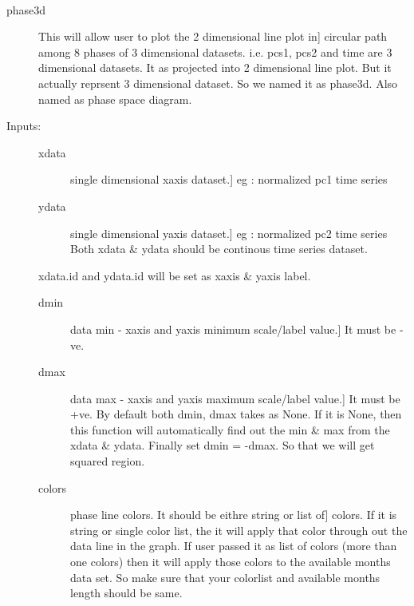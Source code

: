 \documentclass[letterpaper,10pt,english]{sphinxmanual}
\begin{document}
\begin{fulllineitems}
\label{mjo:phase3d.phase3d}~\begin{description}
\item[{phase3d}] \leavevmode{[}This will allow user to plot the 2 dimensional line plot in{]}
circular path among 8 phases of 3 dimensional datasets.
i.e. pcs1, pcs2 and time are 3 dimensional datasets. It as
projected into 2 dimensional line plot. But it actually reprsent
3 dimensional dataset. So we named it as phase3d.
Also named as phase space diagram.

\item[{Inputs:}] \leavevmode\begin{description}
\item[{xdata}] \leavevmode{[}single dimensional xaxis dataset.{]}
eg : normalized pc1 time series

\item[{ydata}] \leavevmode{[}single dimensional yaxis dataset.{]}
eg : normalized pc2 time series
Both xdata \& ydata should be continous time series dataset.

\end{description}

xdata.id and ydata.id will be set as xaxis \& yaxis label.
\begin{description}
\item[{dmin}] \leavevmode{[}data min - xaxis and yaxis minimum scale/label value.{]}
It must be -ve.

\item[{dmax}] \leavevmode{[}data max - xaxis and yaxis maximum scale/label value.{]}
It must be +ve.
By default both dmin, dmax takes as None. If it is None, then
this function will automatically find out the min \& max from
the xdata \& ydata. Finally set dmin = -dmax. So that we will
get squared region.

\item[{colors}] \leavevmode{[}phase line colors. It should be eithre string or list of{]}
colors. If it is string or single color list, the it will
apply that color through out the data line in the graph.
If user passed it as list of colors (more than one colors)
then it will apply those colors to the available months data
set. So make sure that your colorlist and available months
length should be same.


\end{description}
\end{description}
\end{fulllineitems}
\end{document}

